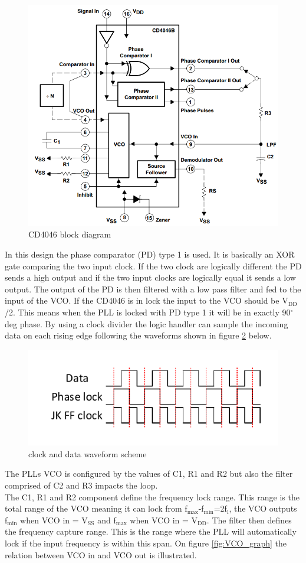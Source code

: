 \begin{figure}[H]
	\centering
	\includegraphics[width=.6\textwidth]{billeder/CD4046}
	\caption{CD4046 block diagram}
	\label{fig:cd4046}
\end{figure}

In this design the phase comparator (PD) type 1 is used. It is basically an XOR gate comparing the two input clock. If the two clock are logically different the PD sends a high output and if the two input clocks are logically equal it sends a low output. The output of the PD is then filtered with a low pass filter and fed to the input of the VCO. If the CD4046 is in lock the input to the VCO should be V$_{\text{DD}}$/2. This means when the PLL is locked with PD type 1 it will be in exactly 90$^{\circ}$deg phase. By using a clock divider the logic handler can sample the incoming data
on each rising edge following the waveforms shown in figure \ref{fig:cd4046waveforms} below.

\begin{figure}[H]
	\centering
	\includegraphics[width=.7\textwidth]{billeder/cd4046waveforms}
	\caption{clock and data waveform scheme}
	\label{fig:cd4046waveforms}
\end{figure}

The PLLs VCO is configured by the values of C1, R1 and R2 but also the filter comprised of C2 and R3 impacts the loop.\\
The C1, R1 and R2 component define the frequency lock range. This range is the total range of the VCO meaning it can lock from f$_{\text{max}}$-f$_{\text{min}}$=2f$_{\text{l}}$, the VCO outputs f$_{\text{min}}$ when VCO in = V$_{\text{SS}}$ and f$_{\text{max}}$ when VCO in = V$_{\text{DD}}$. The filter then defines the frequency capture range. This is the range where the PLL will automatically lock if the input frequency is within this span. On figure \ref{fig:VCO_graph} the relation between VCO in and VCO out is illustrated.

